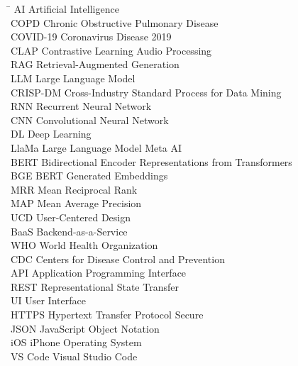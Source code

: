 
\begin{tabbing}

\hspace{2cm} \= \kill
AI \> Artificial Intelligence \\
COPD \> Chronic Obstructive Pulmonary Disease \\
COVID-19 \> Coronavirus Disease 2019 \\
CLAP \> Contrastive Learning Audio Processing \\
RAG \> Retrieval-Augmented Generation \\
LLM \> Large Language Model \\
CRISP-DM \> Cross-Industry Standard Process for Data Mining \\
RNN \> Recurrent Neural Network \\
CNN \> Convolutional Neural Network \\
DL \> Deep Learning \\
LlaMa \> Large Language Model Meta AI \\
BERT \> Bidirectional Encoder Representations from Transformers \\
BGE \> BERT Generated Embeddings \\
MRR \> Mean Reciprocal Rank \\
MAP \> Mean Average Precision \\
UCD \> User-Centered Design \\
BaaS \> Backend-as-a-Service \\
WHO \> World Health Organization \\
CDC \> Centers for Disease Control and Prevention \\
API \> Application Programming Interface \\
REST \> Representational State Transfer \\
UI \> User Interface \\
HTTPS \> Hypertext Transfer Protocol Secure \\
JSON \> JavaScript Object Notation \\
iOS \> iPhone Operating System \\
VS Code \> Visual Studio Code \\

\end{tabbing}
